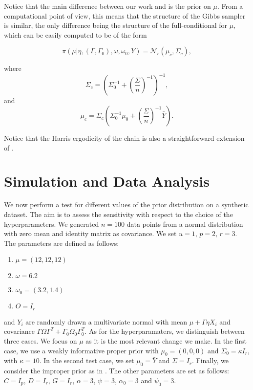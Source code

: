 \documentclass[graybox]{svmult}
\begin{document}
Notice that the main difference between our work and
\cite{khareBayesianApproachEnvelope2017} is the prior on $\mu$. From a
computational point of view, this means that the structure of the
Gibbs sampler is similar, the only difference being the structure of
the full-conditional for $\mu$, which can be easily computed to be of
the form

\begin{equation}
  \label{eq:6}
  \pi \left( \mu | \eta, \left( \Gamma, \Gamma_0 \right), \omega, \omega_0, Y \right) = \mathcal{N}_r\left( \mu_{c}, \Sigma_{c} \right),
\end{equation}

where $$\Sigma_{c} = \left( \Sigma^{-1}_0 + \left(\frac{\Sigma}{n} \right)^{-1}\right)^{-1},$$ and $$\mu_{c} = \Sigma_{c} \left( \Sigma_0^{-1} \mu_0 + \left(\frac{\Sigma}{n} \right)^{-1} \bar{Y} \right).$$

Notice that the Harris ergodicity of the chain is also a
straightforward extension of \cite{khareBayesianApproachEnvelope2017}.

\section{Simulation and Data Analysis}
We now perform a test for different values of the prior distribution
on a synthetic dataset. The aim is to assess the sensitivity with
respect to the choice of the hyperparameters. We generated $n = 100$
data points from a normal distribution with zero mean and identity
matrix as covariance. We set $u = 1$, $p = 2$, $r = 3$. The parameters
are defined as follows:

\begin{enumerate}
\item $\mu = \left( 12, 12, 12 \right)$
\item $\omega = 6.2$
\item $\omega_0 = \left( 3.2, 1.4 \right)$
\item $O = I_r$
\end{enumerate}

and $Y_i$ are randomly drawn a multivariate normal with mean
$\mu + \Gamma \eta X_i$ and covariance
$\Gamma \Omega \Gamma^T + \Gamma_0 \Omega_0 \Gamma_{0}^T$.  As for the
hyperparamaters, we distinguish between three cases. We focus on $\mu$
as it is the most relevant change we make. In the first case, we use a
weakly informative proper prior with $\mu_0 = \left( 0, 0, 0 \right)$
and $\Sigma_0 = \kappa I_r$, with $\kappa = 10$. In the second test
case, we set $\mu_0 = \bar{Y}$ and $\Sigma = I_{r}$. Finally,
we consider the improper prior as in
\cite{khareBayesianApproachEnvelope2017}. The other parameters are set
as follows: $C = I_p$, $D = I_r$, $G = I_r$, $\alpha = 3$, $\psi = 3$, $\alpha_0 = 3$ and $\psi_0 = 3$.
\end{document}
